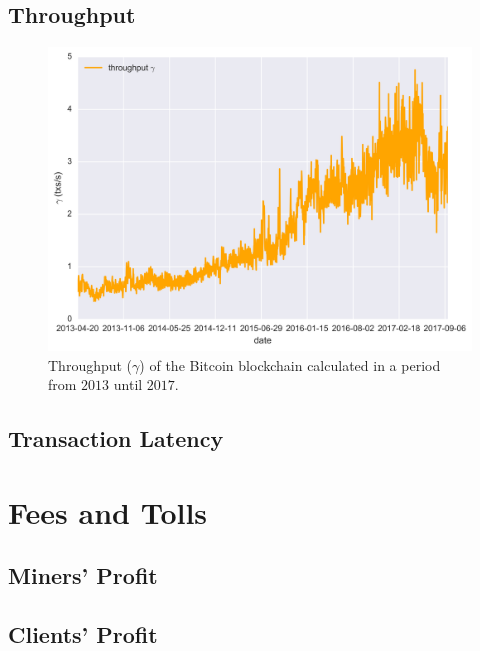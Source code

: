 \documentclass[USenglish]{uit-thesis}
\begin{document}
\subsection{Throughput}
\label{sec:throughput}
\begin{figure}[h]
	\centering
	\includegraphics[width=1\textwidth]{img/throughput}
	\caption{Throughput ($\gamma$) of the Bitcoin blockchain calculated in a period from $2013$ until $2017$.}
	\label{fig:throughput}
\end{figure}

\subsection{Transaction Latency}
\label{sec:txslatency}

\section{Fees and Tolls}
\label{sec:feesandtolls}

\subsection{Miners' Profit}
\label{sec:minersprofit}

\subsection{Clients' Profit}
\label{sec:clientprofit}
\end{document}
